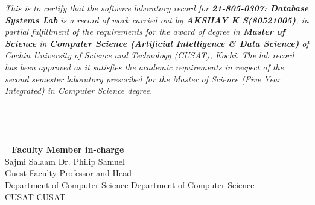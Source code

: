 \documentclass[a4paper,12pt]{report}
\begin{document}
	\textit{This is to certify that the software laboratory record for \textbf{21-805-0307: Database Systems Lab} is a record of work carried out by \textbf{AKSHAY K S(80521005)}, in partial fulfillment of the requirements for the award of degree in \textbf{Master of Science\small{}} \normalsize in \textbf{Computer Science (Artificial Intelligence \& Data Science)} of Cochin University of Science and Technology (CUSAT), Kochi. The lab record has been approved as it satisfies the academic requirements in respect of the second semester laboratory prescribed for the Master of Science (Five Year Integrated) in Computer Science degree.\\\\\\\\\\\ }
	\vspace{50pt}
	\small\textbf{Faculty Member in-charge\\}
	\vspace{0pt}
	Sajmi Salaam \hspace{275pt} Dr. Philip Samuel \\
	Guest Faculty \hspace{267 pt} Professor and Head\\
	Department of Computer Science \hspace{106pt} Department of Computer Science \\
	CUSAT \hspace{352pt} CUSAT
	

	\newpage
	
    \setcounter{page}{1}


	
	\pagestyle{fancy}
	\fancyfoot[C]{}
		
\end{document}

